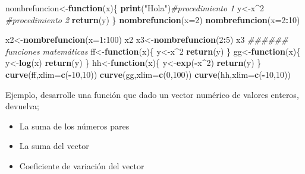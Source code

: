 \documentclass[
]{book}
\newenvironment{Shaded}{\begin{snugshade}}{\end{snugshade}}
\newcommand{\CommentTok}[1]{\textcolor[rgb]{0.56,0.35,0.01}{\textit{#1}}}
\newcommand{\ControlFlowTok}[1]{\textcolor[rgb]{0.13,0.29,0.53}{\textbf{#1}}}
\newcommand{\DataTypeTok}[1]{\textcolor[rgb]{0.13,0.29,0.53}{#1}}
\newcommand{\DecValTok}[1]{\textcolor[rgb]{0.00,0.00,0.81}{#1}}
\newcommand{\KeywordTok}[1]{\textcolor[rgb]{0.13,0.29,0.53}{\textbf{#1}}}
\newcommand{\NormalTok}[1]{#1}
\newcommand{\OperatorTok}[1]{\textcolor[rgb]{0.81,0.36,0.00}{\textbf{#1}}}
\newcommand{\StringTok}[1]{\textcolor[rgb]{0.31,0.60,0.02}{#1}}
\providecommand{\tightlist}{%
  \setlength{\itemsep}{0pt}\setlength{\parskip}{0pt}}
\begin{document}
\begin{Shaded}
\begin{Highlighting}[]
\NormalTok{nombrefuncion<-}\ControlFlowTok{function}\NormalTok{(x)\{}
  \KeywordTok{print}\NormalTok{(}\StringTok{"Hola"}\NormalTok{)}\CommentTok{#procedimiento 1}
\NormalTok{  y<-x}\OperatorTok{^}\DecValTok{2} \CommentTok{#procedimiento 2}
  \KeywordTok{return}\NormalTok{(y)}
\NormalTok{\}}
\KeywordTok{nombrefuncion}\NormalTok{(}\DataTypeTok{x=}\DecValTok{2}\NormalTok{)}
\KeywordTok{nombrefuncion}\NormalTok{(}\DataTypeTok{x=}\DecValTok{2}\OperatorTok{:}\DecValTok{10}\NormalTok{)}

\NormalTok{x2<-}\KeywordTok{nombrefuncion}\NormalTok{(}\DataTypeTok{x=}\DecValTok{1}\OperatorTok{:}\DecValTok{100}\NormalTok{)}
\NormalTok{x2}
\NormalTok{x3<-}\KeywordTok{nombrefuncion}\NormalTok{(}\DecValTok{2}\OperatorTok{:}\DecValTok{5}\NormalTok{)}
\NormalTok{x3}
\CommentTok{###### funciones matemáticas}
\NormalTok{ff<-}\ControlFlowTok{function}\NormalTok{(x)\{}
\NormalTok{  y<-x}\OperatorTok{^}\DecValTok{2}
  \KeywordTok{return}\NormalTok{(y)}
\NormalTok{\}}
\NormalTok{gg<-}\ControlFlowTok{function}\NormalTok{(x)\{}
\NormalTok{  y<-}\KeywordTok{log}\NormalTok{(x)}
  \KeywordTok{return}\NormalTok{(y)}
\NormalTok{\}}
\NormalTok{hh<-}\ControlFlowTok{function}\NormalTok{(x)\{}
\NormalTok{  y<-}\KeywordTok{exp}\NormalTok{(}\OperatorTok{-}\NormalTok{x}\OperatorTok{^}\DecValTok{2}\NormalTok{)}
  \KeywordTok{return}\NormalTok{(y)}
\NormalTok{\}}
\KeywordTok{curve}\NormalTok{(ff,}\DataTypeTok{xlim=}\KeywordTok{c}\NormalTok{(}\OperatorTok{-}\DecValTok{10}\NormalTok{,}\DecValTok{10}\NormalTok{))}
\KeywordTok{curve}\NormalTok{(gg,}\DataTypeTok{xlim=}\KeywordTok{c}\NormalTok{(}\DecValTok{0}\NormalTok{,}\DecValTok{100}\NormalTok{))}
\KeywordTok{curve}\NormalTok{(hh,}\DataTypeTok{xlim=}\KeywordTok{c}\NormalTok{(}\OperatorTok{-}\DecValTok{10}\NormalTok{,}\DecValTok{10}\NormalTok{))}
\end{Highlighting}
\end{Shaded}

Ejemplo, desarrolle una función que dado un vector numérico de valores enteros, devuelva;

\begin{itemize}
\tightlist
\item
  La suma de los números pares
\item
  La suma del vector
\item
  Coeficiente de variación del vector
\end{itemize}
\end{document}
